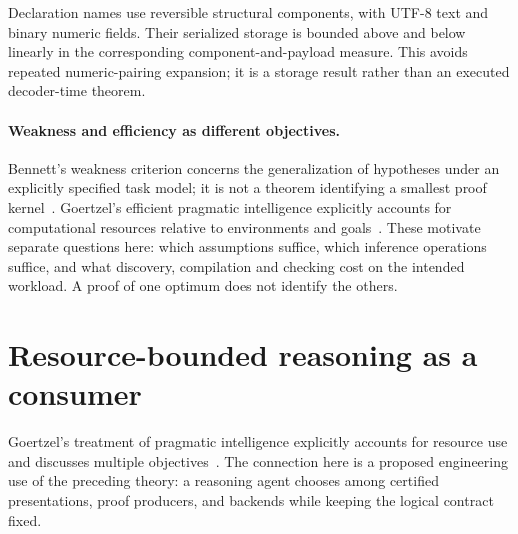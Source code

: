 \documentclass[11pt]{article}
\begin{document}
Declaration names use reversible structural components, with UTF-8 text and
binary numeric fields. Their serialized storage is bounded above and below
linearly in the corresponding component-and-payload measure. This avoids
repeated numeric-pairing expansion; it is a storage result rather than an
executed decoder-time theorem.

\paragraph{Weakness and efficiency as different objectives.}
Bennett's weakness criterion concerns the generalization of hypotheses under
an explicitly specified task model; it is not a theorem identifying a
smallest proof kernel~\cite{bennettweakness}. Goertzel's efficient pragmatic
intelligence explicitly accounts for computational resources relative to
environments and goals~\cite{goertzelefficient}. These motivate separate
questions here: which assumptions suffice, which inference operations suffice,
and what discovery, compilation and checking cost on the intended workload.
A proof of one optimum does not identify the others.

\section{Resource-bounded reasoning as a consumer}
Goertzel's treatment of pragmatic intelligence explicitly accounts for
resource use and discusses multiple objectives~\cite{goertzel}. The
connection here is a proposed engineering use of the preceding theory:
a reasoning agent chooses among certified presentations, proof producers,
and backends while keeping the logical contract fixed.
\end{document}

